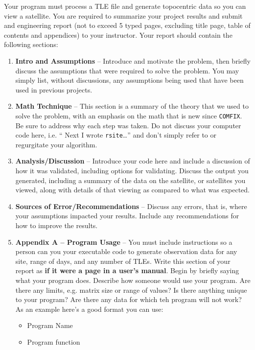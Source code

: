 \documentclass[11pt, reqno]{article}    %
\begin{document}
Your program must process a TLE file and generate topocentric data so you can view a satellite.
You are required to summarize your project results and submit and engineering report (not to exceed \num{5} typed pages, excluding title page, table of contents and appendices) to your instructor.
Your report should contain the following sections:
\begin{enumerate}
    \item \textbf{Intro and Assumptions} -- Introduce and motivate the problem, then briefly discuss the assumptions that were required to solve the problem. 
        You may simply list, without discussions, any assumptions being used that have been used in previous projects.
    \item \textbf{Math Technique} -- This section is a summary of the theory that we used to solve the problem, with an emphasis on the math that is new since \texttt{COMFIX}. 
        Be sure to address why each step was taken. 
        Do not discuss your computer code here, i.e. `` Next I wrote \texttt{rsite}\ldots'' and don't simply refer to or regurgitate your algorithm.
    \item \textbf{Analysis/Discussion} -- Introduce your code here and include a discussion of how it was validated, including options for validating.
        Discuss the output you generated, including a summary of the data on the satellite, or satellites you viewed, along with details of that viewing as compared to what was expected.
    \item \textbf{Sources of Error/Recommendations} -- Discuss any errors, that is, where your assumptions impacted your results. 
        Include any recommendations for how to improve the results.
    \item \textbf{Appendix A -- Program Usage} -- You must include instructions so a person can you your executable code to generate observation data for any site, range of days, and any number of TLEs.
        Write this section of your report as \textbf{if it were a page in a user's manual}.
        Begin by briefly saying what your program does.
        Describe how someone would use your program.
        Are there any limits, e.g. matrix size or range of values?
        Is there anything unique to your program?
        Are there any data for which teh program will not work?
        As an example here's a good format you can use:
        \begin{itemize}
            \item Program Name
            \item Program function

\end{itemize}
\end{enumerate}
\end{document}
